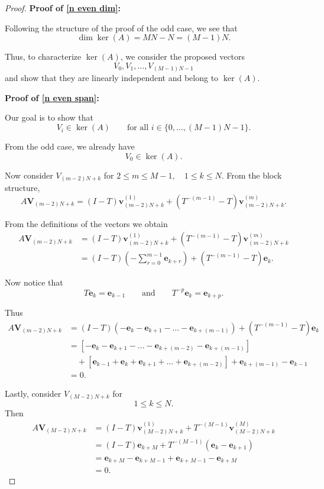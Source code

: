 \documentclass{article}
\begin{document}
\begin{proof}
\noindent\textbf{Proof of \eqref{n even dim}:}

Following the structure of the proof of the odd case, we see that
\[
\dim\ker(A)
=
MN-N
=
(M-1)N.
\]

Thus, to characterize $\ker(A)$, we consider the proposed vectors
\[
V_0,V_1,\dots,V_{(M-1)N-1}
\]
and show that they are linearly independent and belong to $\ker(A)$.

\noindent\textbf{Proof of \eqref{n even span}:}

Our goal is to show that
\[
V_i\in\ker(A)
\qquad
\text{for all }
i\in\{0,\dots,(M-1)N-1\}.
\]

From the odd case, we already have
\[
V_0\in\ker(A).
\]

\noindent Now consider $V_{(m-2)N+k}$ for $2\leq m\leq M-1, \quad 1\leq k\leq N.$
From the block structure,
\[
A\mathbf{V}_{(m-2)N+k}
=
(I-T)\mathbf{v}_{(m-2)N+k}^{(1)}
+
(T^{-(m-1)}-T)\mathbf{v}_{(m-2)N+k}^{(m)}.
\]

From the definitions of the vectors
we obtain
\begin{align*}
A\mathbf{V}_{(m-2)N+k}
&=
(I-T)\mathbf{v}_{(m-2)N+k}^{(1)}
+
(T^{-(m-1)}-T)\mathbf{v}_{(m-2)N+k}^{(m)}\\
&=
(I-T)
\left(-\sum_{r=0}^{m-1} \mathbf{e}_{k+r}
\right)
 +
(T^{-(m-1)}-T)\mathbf{e}_k.
\end{align*}

Now notice that
\[
T\mathbf{e}_k=\mathbf{e}_{k-1}
\qquad\text{and}\qquad
T^{-p}\mathbf{e}_k=\mathbf{e}_{k+p}.
\]

Thus
\begin{align*}
A\mathbf{V}_{(m-2)N+k}
&=
(I-T)
\left(
-\mathbf{e}_k
-\mathbf{e}_{k+1}
-\dots
-\mathbf{e}_{k+(m-1)}
\right)
+
(T^{-(m-1)}-T)\mathbf{e}_k\\
&=
\left[-\mathbf{e}_k
-\mathbf{e}_{k+1}
-\dots
-\mathbf{e}_{k+(m-2)}
-\mathbf{e}_{k+(m-1)}\right]\\
&\quad
+\left[\mathbf{e}_{k-1}
+\mathbf{e}_k
+\mathbf{e}_{k+1}
+\dots
+\mathbf{e}_{k+(m-2)}\right]
+\mathbf{e}_{k+(m-1)}
-\mathbf{e}_{k-1}\\
&=
0.
\end{align*}

Lastly, consider $V_{(M-2)N+k}$ for
\[
1\leq k\leq N.
\]
Then
\begin{align*}
A\mathbf{V}_{(M-2)N+k}
&=
(I-T)\mathbf{v}_{(M-2)N+k}^{(1)}
+
T^{-(M-1)}
\mathbf{v}_{(M-2)N+k}^{(M)}\\
&=
(I-T)\mathbf{e}_{k+M}
+
T^{-(M-1)}
(\mathbf{e}_k-\mathbf{e}_{k+1})\\
&=
\mathbf{e}_{k+M}
-
\mathbf{e}_{k+M-1}
+
\mathbf{e}_{k+M-1}
-
\mathbf{e}_{k+M}\\
&=
0.
\end{align*}


\end{proof}
\end{document}
